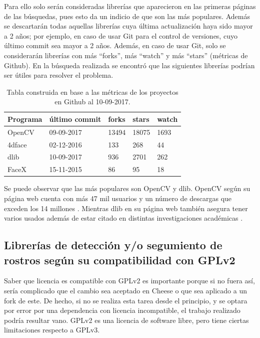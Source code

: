 \documentclass[a4paper,openright,12pt]{report}
\begin{document}
Para ello solo serán consideradas librerías que aparecieron en las primeras
páginas de las búsquedas, pues esto da un indicio de que son las más populares.
Además se descartarán todas aquellas librerías cuya última actualización haya
sido mayor a 2 años; por ejemplo, en caso de usar Git para el control de
versiones, cuyo último commit sea mayor a 2 años. Además, en caso de usar Git,
solo se considerarán librerías con más ``forks'', más ``watch'' y más ``stars''
(métricas de Github). En la búsqueda realizada se encontró que las siguientes
librerías podrían ser útiles para resolver el problema.

\begin{center}
	\begin{table}[h]
  \begin{tabular}{| l | l | l | l | l |}
  \hline
  Programa & último commit & forks & stars & watch \\ \hline
  OpenCV & 09-09-2017 & 13494 & 18075 & 1693 \\ \hline
  4dface & 02-12-2016 & 133 & 268 & 44 \\ \hline
  dlib & 10-09-2017 & 936 & 2701 & 262 \\ \hline
  FaceX & 15-11-2015 & 86 & 95 & 18 \\ \hline
  \end{tabular}
  \caption{Tabla construida en base a las métricas de los proyectos en Github
           al 10-09-2017.}
	\end{table}
\end{center}

Se puede observar que las más populares son OpenCV y dlib. OpenCV según su
página web cuenta con más 47 mil usuarios y un número de descargas que exceden
los 14 millones \cite{OpenCV}. Mientras dlib en su página web también asegura
tener varios usados además de estar citado en distintas investigaciones
académicas \cite{dlibUsers}.

\subsection{Librerías de detección y/o segumiento de rostros según su
            compatibilidad con GPLv2}
Saber que licencia es compatible con GPLv2 es importante porque si no fuera así,
sería complicado que el cambio sea aceptado en Cheese o que sea aplicado a un
fork de este. De hecho, si no se realiza esta tarea desde el principio, y se
optara por error por una dependencia con licencia incompatible, el trabajo
realizado podría resultar vano. GPLv2 es una licencia de software libre, pero
tiene ciertas limitaciones respecto a GPLv3.
\end{document}
